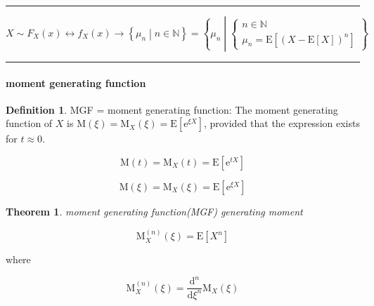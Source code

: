 \documentclass[
]{book}
\newtheorem{theorem}{Theorem}[chapter]
\theoremstyle{definition}
\newtheorem{definition}{Definition}[chapter]
\theoremstyle{definition}
\theoremstyle{definition}
\theoremstyle{definition}
\theoremstyle{remark}
\begin{document}
\begin{center}\rule{0.5\linewidth}{0.5pt}\end{center}

\[
X\sim F_{{\scriptscriptstyle X}}\left(x\right)\leftrightarrow f_{{\scriptscriptstyle X}}\left(x\right)\rightarrow\left\{ \mu_{{\scriptscriptstyle n}}\middle|n\in\mathbb{N}\right\} =\left\{ \mu_{{\scriptscriptstyle n}}\middle|\begin{cases}
n\in\mathbb{N}\\
\mu_{{\scriptscriptstyle n}}=\mathrm{E}\left[\left(X-\mathrm{E}\left[X\right]\right)^{n}\right]
\end{cases}\right\} 
\]

\begin{center}\rule{0.5\linewidth}{0.5pt}\end{center}

\hypertarget{moment-generating-function}{%
\paragraph{moment generating function}\label{moment-generating-function}}

\begin{definition}
\protect\hypertarget{def:unnamed-chunk-26}{}\label{def:unnamed-chunk-26}MGF = moment generating function: The moment generating function of \(X\) is \(\mathrm{M}\left(\xi\right)=\mathrm{M}_{{\scriptscriptstyle X}}\left(\xi\right)=\mathrm{E}\left[\mathrm{e}^{\xi X}\right]\), provided that the expression exists for \(t\approx0\).
\end{definition}

\[
\mathrm{M}\left(t\right)=\mathrm{M}_{{\scriptscriptstyle X}}\left(t\right)=\mathrm{E}\left[\mathrm{e}^{tX}\right]
\]

\[
\mathrm{M}\left(\xi\right)=\mathrm{M}_{{\scriptscriptstyle X}}\left(\xi\right)=\mathrm{E}\left[\mathrm{e}^{\xi X}\right]
\]

\begin{theorem}
\protect\hypertarget{thm:unnamed-chunk-27}{}\label{thm:unnamed-chunk-27}moment generating function(MGF) generating moment
\end{theorem}

\[
\mathrm{M}_{{\scriptscriptstyle X}}^{\left(n\right)}\left(\xi\right)=\mathrm{E}\left[X^{n}\right]
\]

where

\[
\mathrm{M}_{{\scriptscriptstyle X}}^{\left(n\right)}\left(\xi\right)=\dfrac{\mathrm{d}^{n}}{\mathrm{d}\xi^{n}}\mathrm{M}_{{\scriptscriptstyle X}}\left(\xi\right)
\]
\end{document}

